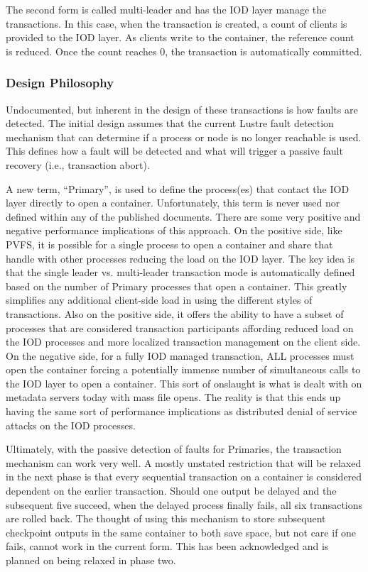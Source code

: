 \documentclass[conference]{sig-alt-gov2}
\begin{document}
The second form is called multi-leader and has the IOD layer manage the
transactions. In this case, when the transaction is created, a count of clients
is provided to the IOD layer. As clients write to the container, the reference
count is reduced. Once the count reaches 0, the transaction is automatically
committed.

\subsubsection{Design Philosophy}
Undocumented, but inherent in the design of these transactions is how faults
are detected. The initial design assumes that the current Lustre fault
detection mechanism that can determine if a process or node is no longer
reachable is used. This defines how a fault will be detected and what will trigger a passive fault recovery (i.e., transaction abort).

A new term, ``Primary'', is used to define the process(es) that contact the IOD
layer directly to open a container. Unfortunately, this term is never used nor
defined within any of the published documents. There are some very positive and
negative performance implications of this approach. On the positive side, like
PVFS, it is possible for a single process to open a container and share that
handle with other processes reducing the load on the IOD layer. The key idea is
that the single leader vs. multi-leader transaction mode is automatically defined based on the number of Primary processes that open a container. This greatly
simplifies any additional client-side load in using the different styles of transactions. Also on the positive side, it offers the ability to have a subset of
processes that are considered transaction participants affording reduced load
on the IOD processes and more localized transaction management on the client
side. On the negative side, for a fully IOD managed transaction, ALL processes
must open the container forcing a potentially immense number of simultaneous
calls to the IOD layer to open a container. This sort of onslaught is what is
dealt with on metadata servers today with mass file opens. The reality is that
this ends up having the same sort of performance implications as distributed
denial of service attacks on the IOD processes.

Ultimately, with the passive detection of faults for Primaries, the transaction
mechanism can work very well. A mostly unstated restriction that will be
relaxed in the next phase is that every sequential transaction on a container
is considered dependent on the earlier transaction. Should one output be
delayed and the subsequent five succeed, when the delayed process finally
fails, all six transactions are rolled back. The thought of using this
mechanism to store subsequent checkpoint outputs in the same container to both
save space, but not care if one fails, cannot work in the current form. This
has been acknowledged and is planned on being relaxed in phase two.
\end{document}
